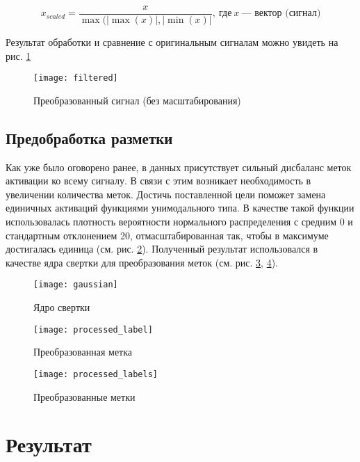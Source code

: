 \begin{equation} \label{eq:scaling}
	x_{scaled} = \frac{x}{\max(|\max(x)|, |\min(x)|}, \: \text{где} \: x \: \text{--- вектор (сигнал)}
\end{equation}

\noindent Результат обработки и сравнение с оригинальным сигналам можно увидеть
на рис. \ref{fig:filtered}

\begin{figure}[!htb]
	\centering
	\caption{Преобразованный сигнал (без масштабирования)}
	\texttt{[image: filtered]}
	\label{fig:filtered}
\end{figure}

\subsection{Предобработка разметки} Как уже было оговорено ранее, в данных
присутствует сильный дисбаланс меток активации ко всему сигналу. В связи с этим
возникает необходимость в увеличении количества меток. Достичь поставленной
цели поможет замена единичных активаций функциями унимодального типа. В
качестве такой функции использовалась плотность вероятности нормального
распределения с средним 0 и стандартным отклонением 20, отмасштабированная так,
чтобы в максимуме достигалась единица (см. рис. \ref{fig:gaussian}). Полученный
результат использовался в качестве ядра свертки для преобразования меток (см.
рис. \ref{fig:processed-label}, \ref{fig:processed-labels}).


\begin{figure}[!htb]
	\centering
	\caption{Ядро свертки}
	\texttt{[image: gaussian]}
	\label{fig:gaussian}
\end{figure}

\begin{figure}[!htb]
	\centering
	\caption{Преобразованная метка}
	\texttt{[image: processed\_label]}
	\label{fig:processed-label}
\end{figure}

\begin{figure}[!htb]
	\centering
	\caption{Преобразованные метки}
	\texttt{[image: processed\_labels]}
	\label{fig:processed-labels}
\end{figure}


\section{Результат}

